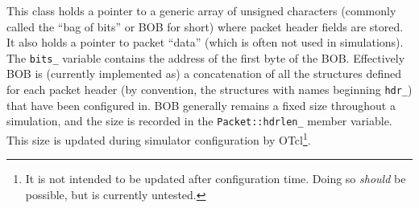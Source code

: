 This class holds a pointer to a generic array of unsigned
characters (commonly called the ``bag of bits'' or BOB for short)
where packet header fields are stored.
It also holds a pointer to packet ``data'' (which is often not used in
simulations).
The {\tt bits\_} variable contains the address of
the first byte of the BOB.
Effectively BOB is (currently implemented as) a concatenation
of all the structures defined for each packet header (by convention,
the structures with names beginning {\tt hdr\_}) that have
been configured in.
BOB generally remains a fixed size throughout a simulation, and
the size is recorded in the {\tt Packet::hdrlen\_} member
variable.
This size is updated during simulator configuration by
OTcl\footnote{It is not intended to be updated after configuration
time.  Doing so {\em should} be possible, but is currently untested.}.

